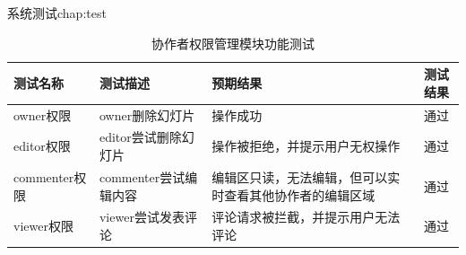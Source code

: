 \begin{cuzchapter}{系统测试}{chap:test}
    \begin{table}[htbp]
        \caption{协作者权限管理模块功能测试}
        \label{tab:test-permission}
        \centering
        \begin{tabular}{>{\raggedright\arraybackslash}p{2.5cm} >{\raggedright\arraybackslash}p{5.5cm} >{\raggedright\arraybackslash}p{4cm} c}
            \toprule
            测试名称        & 测试描述                & 预期结果              & 测试结果 \\
            \midrule
            owner权限     & owner删除幻灯片      & 操作成功              & 通过 \\
            \addlinespace
            editor权限    & editor尝试删除幻灯片   & 操作被拒绝，并提示用户无权操作   & 通过 \\
            \addlinespace
            commenter权限 & commenter尝试编辑内容  & 编辑区只读，无法编辑，但可以实时查看其他协作者的编辑区域  & 通过 \\
            \addlinespace
            viewer权限    & viewer尝试发表评论    & 评论请求被拦截，并提示用户无法评论 & 通过 \\
            \bottomrule
        \end{tabular}
    \end{table}

\end{cuzchapter}
